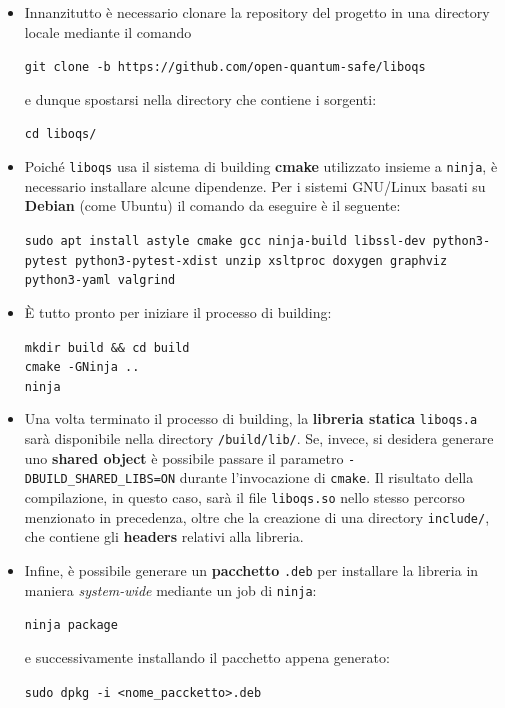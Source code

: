 \documentclass[a4paper, 12pt, oneside]{article}
\theoremstyle{definition}
\begin{document}
\begin{itemize}
    \item Innanzitutto è necessario clonare la repository del progetto in una directory locale mediante il comando \begin{center}
        \texttt{git clone -b https://github.com/open-quantum-safe/liboqs}
    \end{center}
    e dunque spostarsi nella directory che contiene i sorgenti:
    \begin{center}
        \texttt{cd liboqs/}
    \end{center}
    \item Poiché \texttt{liboqs} usa il sistema di building \textbf{cmake} utilizzato insieme a \texttt{ninja}, è necessario installare alcune dipendenze. Per i sistemi GNU/Linux basati su \textbf{Debian} (come Ubuntu) il comando da eseguire è il seguente:
    \begin{center}
        \texttt{sudo apt install astyle cmake gcc ninja-build libssl-dev python3-pytest python3-pytest-xdist unzip xsltproc doxygen graphviz python3-yaml valgrind}
    \end{center}
    \item È tutto pronto per iniziare il processo di building:
    \begin{center}
        \texttt{mkdir build \&\& cd build \\
        cmake -GNinja .. \\
        ninja}
    \end{center}
    \item Una volta terminato il processo di building, la \textbf{libreria statica} \texttt{liboqs.a} sarà disponibile nella directory \texttt{/build/lib/}. Se, invece, si desidera generare uno \textbf{shared object} è possibile passare il parametro \texttt{-DBUILD\_SHARED\_LIBS=ON} durante l'invocazione di \texttt{cmake}. Il risultato della compilazione, in questo caso, sarà il file \texttt{liboqs.so} nello stesso percorso menzionato in precedenza, oltre che la creazione di una directory \texttt{include/}, che contiene gli \textbf{headers} relativi alla libreria.
    \item Infine, è possibile generare un \textbf{pacchetto} \texttt{.deb} per installare la libreria in maniera \textit{system-wide} mediante un job di \texttt{ninja}:
    \begin{center}
        \texttt{ninja package}
    \end{center}
    e successivamente installando il pacchetto appena generato:
    \begin{center}
        \texttt{sudo dpkg -i <nome\_paccketto>.deb}
    \end{center}
\end{itemize}
\end{document}
